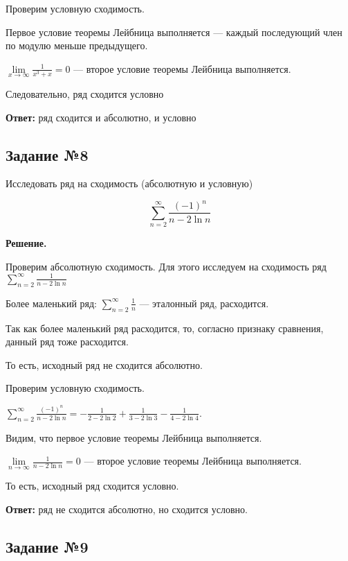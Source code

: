 \documentclass{article}
\begin{document}
\hfill

Проверим условную сходимость.

Первое условие теоремы Лейбница выполняется — каждый последующий член по модулю меньше предыдущего.

$\lim\limits_{x \to \infty} \frac{1}{x^3 + x} = 0$ — второе условие теоремы Лейбница выполняется.

Следовательно, ряд сходится условно

\hfill

\textbf{Ответ:} ряд сходится и абсолютно, и условно

\subsection{Задание №8}

Исследовать ряд на сходимость (абсолютную и условную)

$$
\sum\limits_{n = 2}^{\infty} \frac{(-1)^{n}}{n - 2 \ln n}
$$

\textbf{Решение.}

Проверим абсолютную сходимость. Для этого исследуем на сходимость ряд $\sum\limits_{n = 2}^{\infty} \frac{1}{n - 2 \ln n}$

Более маленький ряд: $\sum\limits_{n = 2}^{\infty} \frac{1}{n}$ — эталонный ряд, расходится.

Так как более маленький ряд расходится, то, согласно признаку сравнения, данный ряд тоже расходится.

То есть, исходный ряд не сходится абсолютно.

\hfill

Проверим условную сходимость.

$\sum\limits_{n = 2}^{\infty} \frac{(-1)^{n}}{n - 2 \ln n} = -\frac{1}{2 - 2 \ln 2} + \frac{1}{3 - 2 \ln 3} - \frac{1}{4 - 2 \ln 4}$.

Видим, что первое условие теоремы Лейбница выполняется.

$\lim\limits_{n \to \infty} \frac{1}{n - 2 \ln n} = 0$ — второе условие теоремы Лейбница выполняется.

То есть, исходный ряд сходится условно.

\hfill

\textbf{Ответ:} ряд не сходится абсолютно, но сходится условно.

\subsection{Задание №9}
\end{document}
